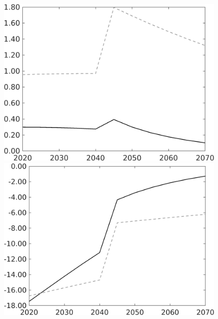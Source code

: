 \begin{figure}[h!!]
\begin{minipage}[]{0.32\textwidth}
	\end{minipage}	
	\begin{minipage}[]{0.32\textwidth}
		\includegraphics[width=1\textwidth]{../../codding_model/own_basedOnFried/optimalPol_010922_revision/figures/all_13Sept22/CompTaufPER_bytaul_KN_Reg0_gAn_spillover0_nsk0_xgr0_knspil0_sep0_LFlimit1_emsbase0_countec0_GovRev0_etaa0.79_lgd0.png} \end{minipage}	
	\begin{minipage}[]{0.32\textwidth}
		\includegraphics[width=1\textwidth]{../../codding_model/own_basedOnFried/optimalPol_010922_revision/figures/all_13Sept22/CompTaufPER_bytaul_KN_Reg0_gAg_spillover0_nsk0_xgr0_knspil0_sep0_LFlimit1_emsbase0_countec0_GovRev0_etaa0.79_lgd0.png} 
	\end{minipage}	
\end{figure}
\clearpage

